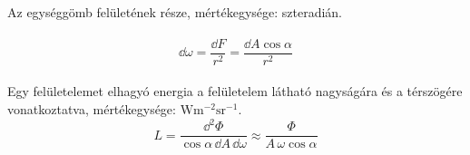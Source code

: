 \documentclass[../../main.tex]{subfiles}
\begin{document}
\paragraph*{}
Az egységgömb felületének része, mértékegysége: szteradián.

\paragraph*{}
\[
  \dd \omega
  = \frac{\dd F}{r^2}
  = \frac{\dd A \cos \alpha}{r^2}
\]

\paragraph*{}
Egy felületelemet elhagyó energia a felületelem látható nagyságára és a
térszögére vonatkoztatva, mértékegysége: $\mathrm{W m^{-2} sr^{-1}}$.
\[
  L = \frac{\dd^2 \varPhi}{\cos \alpha \, \dd  A \, \dd \omega}
  \approx \frac{\varPhi}{A \, \omega \cos \alpha}
\]
\end{document}
